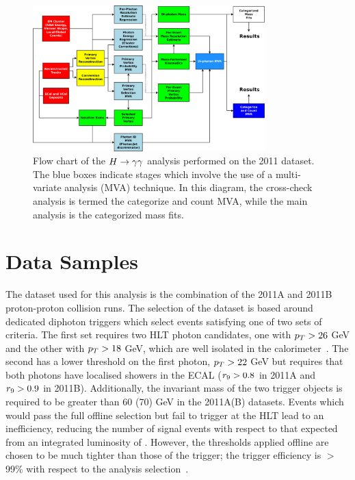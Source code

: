 \begin{figure}
\includegraphics[width=0.8\textwidth]{hgg7TeV/generalPlots/manalysisflow.pdf}
\caption{Flow chart of the $H\rightarrow\gamma\gamma$ analysis performed on the 2011 dataset. The blue boxes
 indicate stages which involve the use of a multi-variate analysis (MVA) technique. 
In this diagram, the cross-check analysis is termed the categorize and count MVA, while the 
main analysis is the categorized mass fits.}
\label{fig:mvaoverview}
\end{figure}

\section{Data Samples}
\label{sec:datasamples}

The dataset used for this analysis is the combination of the 2011A and 2011B 
proton-proton collision runs.
The selection of the dataset is based around dedicated diphoton triggers
which select events satisfying one of two sets of criteria.
The first set requires two HLT photon candidates, one with $p_{T}>26$ GeV and the other with 
$p_{T}>18$ GeV, which are well isolated in the calorimeter~\citep{AN-12-048}. The second has a lower threshold on
the first photon, $p_{T}>22$ GeV but requires that both photons have localised showers in the ECAL 
($r_{9}>0.8$ in 2011A and $r_{9}>0.9$ in 2011B). 
Additionally, the invariant mass of the two trigger objects is required to be 
greater than 60 (70) GeV in the 2011A(B) datasets.
Events which would pass the full offline selection but fail to trigger at the HLT lead to an inefficiency, 
reducing the number of signal events with respect to that expected from an integrated luminosity of \clumi.
However, the thresholds applied offline are chosen to be much tighter than those of the trigger;
the trigger efficiency is $>$99\% with respect to the analysis selection~\citep{AN-12-048}. 

